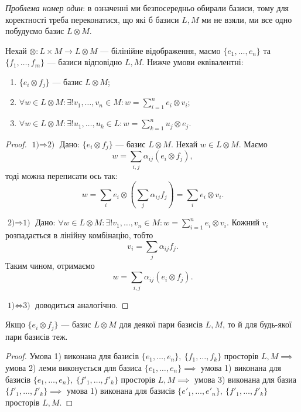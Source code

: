\documentclass{math_library}
\begin{document}
\begin{remark}
\textit{Проблема номер один}: в означенні ми безпосередньо обирали базиси, тому для коректності треба переконатися, що які б базиси $L,M$ ми не взяли, ми все одно побудуємо базис $L \otimes M$.
\end{remark}

\begin{lemma}
Нехай $\otimes \colon L \times M \to L \otimes M$ --- білінійне відображення, маємо $\{e_1,\dots,e_n\}$ та $\{f_1,\dots,f_m\}$ --- базиси відповідно $L,M$. Нижче умови еквівалентні:
\begin{enumerate}[nosep,wide=0pt,label={\arabic*)}]
\item $\{e_i \otimes f_j\}$ --- базис $L \otimes M$;
\item $\forall w \in L \otimes M: \exists ! v_1,\dots,v_n \in M: w = \displaystyle\sum_{i=1}^n e_i \otimes v_i$;
\item $\forall w \in L \otimes M: \exists ! u_1,\dots,u_k \in L: w = \displaystyle\sum_{k=1}^n u_j \otimes e_j$.
\end{enumerate}
\end{lemma}

\begin{proof}
$\boxed{\text{1)} \Rightarrow \text{2)}}$ Дано: $\{e_i \otimes f_j\}$ --- базис $L \otimes M$. Нехай $w \in L \otimes M$. Маємо
\[
w = \displaystyle\sum_{i,j} \alpha_{ij} (e_i \otimes f_j),
\]
тоді можна переписати ось так: 
\[
w = \displaystyle\sum_i e_i \otimes \left( \sum_j \alpha_{ij} f_j \right) = \sum_i e_i \otimes v_i.
\]

$\boxed{\text{2)} \Rightarrow \text{1)}}$ Дано: $\forall w \in L \otimes M: \exists ! v_1,\dots,v_n \in M: w = \displaystyle\sum_{i=1}^n e_i \otimes v_i$. Кожний $v_i$ розпадається в лінійну комбінацію, тобто \[
v_i = \displaystyle\sum_j \alpha_{ij} f_j.
\]
Таким чином, отримаємо 
\[
w = \displaystyle\sum_{i,j} \alpha_{ij} (e_i \otimes f_j).
\]

$\boxed{\text{1)} \iff \text{3)}}$ доводиться аналогічно.
\end{proof}

\begin{corollary}
Якщо $\{e_i \otimes f_j\}$ --- базис $L \otimes M$ для деякої пари базисів $L,M$, то й для будь-якої пари базисів теж.
\end{corollary}

\begin{proof}
Умова 1) виконана для базисів $\{e_1,\dots,e_n\},\ \{f_1,\dots,f_k\}$ просторів $L,M \implies$ умова 2) леми виконується для базиса $\{e_1,\dots,e_n\} \implies$ умова 1) виконана для базисів $\{e_1,\dots,e_n\},\ \{f'_1,\dots,f'_k\}$ просторів $L,M \implies$ умова 3) виконана для базиа $\{f'_1,\dots,f'_k\} \implies$ умова 1) виконана для базисів $\{e'_1,\dots,e'_n\},\ \{f'_1,\dots,f'_k\}$ просторів $L,M$.
\end{proof}
\end{document}

